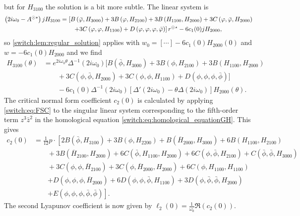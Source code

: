 but for $H_{3100}$ the solution is a bit more subtle. The linear system is
\begin{align*}
\left(2i\omega_{0}-A^{\odot\star}\right) jH_{3100} &= \left[B\left(\bar{\varphi},H_{3000}\right)+3B\left(\varphi,H_{2100}\right)+3B\left(H_{1100},H_{2000}\right) + 3C\left(\varphi,\bar{\varphi},H_{2000}\right) \right. \\
 & \qquad \left. + 3C\left(\varphi,\varphi,H_{1100}\right)+D\left(\varphi,\varphi,\varphi,\bar{\varphi}\right) \right] r^{\odot\star} -6 c_1(0) jH_{2000},
\end{align*}
so \cref{switch:lem:regular_solution} applies with $w_0 = [\cdots] - 6c_1(0)H_{2000}(0)$ and $w = -6c_1(0)H_{2000}$ and we find
\[
  \begin{aligned}
    H_{3100}(\theta) &=e^{2i\omega_0\theta}\Delta^{-1}(2i\omega_0)[B(\bar{\phi},H_{3000}) + 3B(\phi,H_{2100}) + 3B(H_{1100},H_{2000}) \\
    & \qquad + 3C(\phi,\bar{\phi},H_{2000}) + 3C(\phi,\phi,H_{1100}) + D(\phi,\phi,\phi,\bar{\phi})]\\
    & \qquad - 6c_1(0)\Delta^{-1}(2i\omega_0)[\Delta'(2i\omega_0) - \theta\Delta(2i\omega_0)]H_{2000}(\theta).
  \end{aligned}
\]
The critical normal form coefficient $c_{2}(0)$ is calculated by applying \cref{switch:eq:FSC} to the singular linear system corresponding to the fifth-order term $z^{3}\bar{z}^{2}$ in the homological equation \cref{switch:eq:homological_equationGH}. This gives
\begin{align*}
	c_{2}(0) & =\frac{1}{12}p \cdot \left[2B\left(\bar{\phi},H_{3100}\right)+3B\left(\phi,H_{2200}\right)+B\left(\overline{H}_{2000},H_{3000}\right)+6B\left(H_{1100},H_{2100}\right) \right.\\
 &\qquad+3B\left(\overline{H}_{2100},H_{2000}\right)+6C\left(\bar{\phi},H_{1100},H_{2000}\right)+6C\left(\phi,\bar{\phi},H_{2100}\right)+C\left(\bar{\phi},\bar{\phi},H_{3000}\right)\\
 &\qquad+3C\left(\phi,\phi,\overline{H}_{2100}\right)+3C\left(\phi,\overline{H}_{2000},H_{2000}\right)+6C\left(\phi,H_{1100},H_{1100}\right)\\
 &\qquad\left. +D\left(\phi,\phi,\phi,\overline{H}_{2000}\right)+6D\left(\phi,\phi,\bar{\phi},H_{1100}\right)+3D\left(\phi,\bar{\phi},\bar{\phi},H_{2000}\right) \right. \\ &\qquad \left. +E\left(\phi,\phi,\phi,\bar{\phi},\bar{\phi}\right)\right].
\end{align*}
The second Lyapunov coefficient is now given by $\ell_2(0)=\frac{1}{\omega_0} \Re(c_2(0))$.

